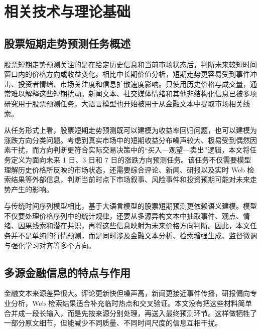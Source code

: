 
\chapter{相关技术与理论基础}

\section{股票短期走势预测任务概述}

股票短期走势预测关注的是在给定历史信息和当前市场状态后，判断未来较短时间窗口内的价格方向或收益变化。相比中长期价值分析，短期走势更容易受到事件冲击、投资者情绪、市场关注度和信息扩散速度影响。只使用历史价格与成交量，通常难以解释这些短期扰动。新闻文本、社交媒体情绪和其他非结构化信息已被多项研究用于股票预测任务，大语言模型也开始被用于从金融文本中提取市场相关线索\cite{bollen2011twitter,zhang2025gnn,zhou2025expertopinion,lopezlira2023chatgptstock,elahi2024financialnewsllm}。

从任务形式上看，股票短期走势预测既可以建模为收益率回归问题，也可以建模为涨跌方向分类问题。考虑到真实市场中的短期收益分布噪声较大、极易受到偶然因素干扰，而方向判断更符合实际交易决策中的“买入—观望—卖出”逻辑，本文将任务定义为面向未来 1 日、3 日和 7 日的涨跌方向预测任务。该任务不仅需要模型理解历史价格所反映的市场状态，还需要综合评论、新闻、研报以及实时 Web 检索结果等外部信息，判断当前时点下市场叙事、风险事件和投资预期可能对未来走势产生的影响。

与传统时间序列模型相比，基于大语言模型的股票短期预测更依赖语义建模。模型不仅要处理价格序列中的统计规律，还要从多源异构文本中抽取事件、观点、情绪、因果线索和潜在共识，再将这些信息映射为未来价格方向判断。因此，本文任务并不是单纯的行情预测，而是同时涉及金融文本分析、检索增强生成、监督微调与强化学习对齐等多个方向\cite{lewis2020rag,ye2024r2ag,lee2024finllms,li2023llmfinance,nie2024llmfinancialapplications,yang2023fingpt,wu2023bloomberggpt}。

\section{多源金融信息的特点与作用}

金融文本来源差异很大。评论更新快但噪声高，新闻更接近事件传播，研报偏向专业分析，Web 检索结果适合补充临时热点和交叉验证。本文没有把这些材料简单合并成一段长输入，而是先按来源分别处理，再送入最终预测环节。这样做牺牲了一部分原文细节，但能减少不同质量、不同时间尺度的信息互相干扰\cite{lee2024finllms,li2023llmfinance,nie2024llmfinancialapplications}。

